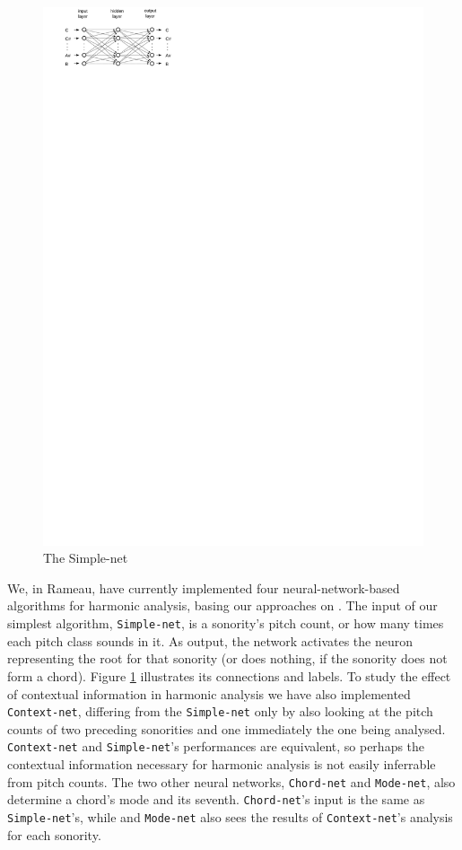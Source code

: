 \documentclass{article}
\begin{document}
\begin{figure}
  \includegraphics[]{neural-networks}
  \caption{The Simple-net}
  \label{fig:simple-net-diagram}
\end{figure}


We, in Rameau, have currently implemented four neural-network-based
algorithms for harmonic analysis, basing our approaches on
\cite{tsui:harmonic}. The input of our
simplest algorithm, \texttt{Simple\hyp{}net}, is a sonority's pitch
count, or how many times each pitch class sounds in it. As output, the
network activates the neuron representing the root for that sonority
(or does nothing, if the sonority does not form a chord).  Figure
\ref{fig:simple-net-diagram} illustrates its connections and labels.
To study the effect of contextual information in harmonic analysis we
have also implemented \texttt{Context-net}, differing from the
\texttt{Simple\hyp{}net} only by also looking at the pitch counts of
two preceding sonorities and one immediately the one being
analysed. \texttt{Context-net} and \texttt{Simple-net}'s performances
are equivalent, so perhaps the contextual information necessary for
harmonic analysis is not easily inferrable from pitch counts. The two
other neural networks, \texttt{Chord-net} and \texttt{Mode-net}, also
determine a chord's mode and its seventh. \texttt{Chord-net}'s input
is the same as \texttt{Sim\-ple\--net}'s, while and \texttt{Mode-net}
also sees the results of \texttt{Context-net}'s analysis for each
sonority.
\end{document}
